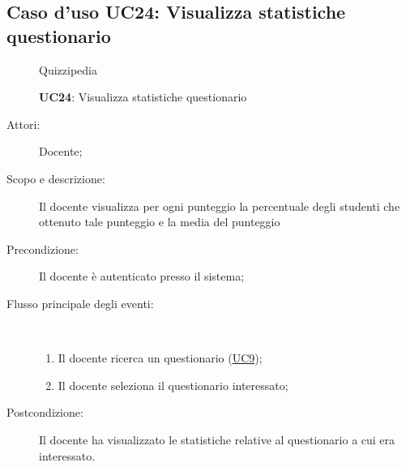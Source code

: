 \subsection{Caso d'uso UC24: Visualizza statistiche questionario}
	\begin{figure}[H]
		\centering
		\begin{resizedtikzpicture}{\textwidth}
		\begin{umlsystem}[x=0, fill=lightgray!20]{Quizzipedia}
		\end{umlsystem}
		\end{resizedtikzpicture}
		\caption{\textbf{UC24}: Visualizza statistiche questionario}
		\label{UC24}
	\end{figure}
\begin{description}
\item[Attori:] Docente;
\item[Scopo e descrizione:] Il docente visualizza per ogni punteggio la percentuale degli studenti che ottenuto tale punteggio e la media del punteggio
      \item[Precondizione:] Il docente è autenticato presso il sistema;

        \item[Flusso principale degli eventi:] \ 
 \begin{enumerate}
          \item Il docente ricerca un questionario (\hyperlink{UC9}{UC9});
          \item Il docente seleziona il questionario interessato;

      \end{enumerate}
    \item[Postcondizione:] Il docente ha visualizzato le statistiche relative al questionario a cui era interessato.
  \end{description}
\hypertarget{UC25}{}
